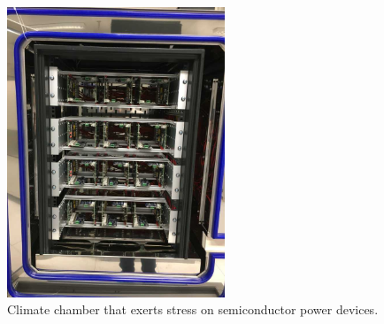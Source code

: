 \begin{figure}
		\centering
		\includegraphics[trim=100 50 0 0, clip, width=65mm]{images/DCDC_System2.jpg}
		\caption{Climate chamber that exerts stress on semiconductor power devices.}
		\label{fig:Climate}
\end{figure}

